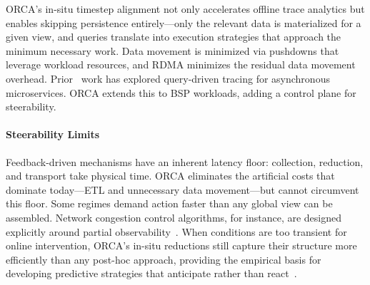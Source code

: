 ORCA's in-situ timestep alignment not only accelerates offline trace analytics but enables
skipping
persistence entirely---only the relevant data is materialized for a given view, and queries
translate into execution strategies that approach the minimum necessary work.
Data movement is minimized via pushdowns that leverage workload resources, and RDMA minimizes
the residual data movement overhead.
Prior~\cite{Erlin2011:Fay,Berg2021:Snicket,Mace2015:Pivottracing} work has explored query-driven
tracing for asynchronous microservices.
ORCA extends this to BSP workloads, adding a control plane for steerability.



\paragraph{Steerability Limits}
Feedback-driven mechanisms have an inherent latency floor: collection, reduction, and transport
take physical time.
ORCA eliminates the artificial costs that dominate today---ETL and unnecessary data
movement---but cannot circumvent this floor.
Some regimes demand action faster than any global view can be assembled.
Network congestion control algorithms, for instance, are designed explicitly around partial
observability~\cite{Jacob1988:CCAPartial}.
When conditions are too transient for online intervention, ORCA's in-situ reductions still capture
their structure more efficiently than any post-hoc approach, providing the empirical basis for
developing predictive strategies that anticipate rather than react~\cite{Smith1957:Predict}.

